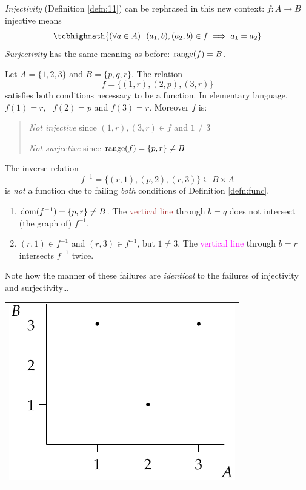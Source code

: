 \emph{Injectivity} (Definition \ref{defn:11}) can be rephrased in this new context: $f:A\to B$ injective means
\[
	\tcbhighmath{(\forall a\in A)\ \ (a_1,b),(a_2,b)\in f\implies a_1=a_2}
\]
\emph{Surjectivity} has the same meaning as before: $\operatorname{range}(f)=B$.

\goodbreak


\begin{example}[lower separated=false, sidebyside, sidebyside align=top seam, sidebyside gap=0pt, righthand width=0.33\linewidth]{}{}
	Let $A=\{1,2,3\}$ and $B=\{p,q,r\}$. The relation
	\[
		f=\bigl\{(1,r),(2,p),(3,r)\bigr\}
	\]
	satisfies both conditions necessary to be a function. In elementary language, $f(1)=r$, \ $f(2)=p$ and $f(3)=r$. Moreover $f$ is:
	\begin{quote}
		\emph{Not injective} since $(1,r),(3,r)\in f$ and $1\neq 3$\par
		\emph{Not surjective} since $\operatorname{range}(f)=\{p,r\}\neq B$
	\end{quote}
	The inverse relation
	\[
		f^{-1}=\bigl\{(r,1),(p,2),(r,3)\bigr\}
		\subseteq B\times A
	\]
	is \emph{not} a function due to failing \emph{both} conditions of Definition \ref{defn:func}.
	\begin{enumerate}
		 \item $\operatorname{dom}(f^{-1})=\{p,r\} \neq B$. The \textcolor{Brown}{vertical line} through $b=q$ does not intersect (the graph of) $f^{-1}$.
		 \item $(r,1)\in f^{-1}$ and $(r,3)\in f^{-1}$, but $1\neq 3$. The \textcolor{magenta}{vertical line} through $b=r$ intersects $f^{-1}$ twice.
	\end{enumerate}
	Note how the manner of these failures are \emph{identical} to the failures of injectivity and surjectivity\ldots
	\tcblower
	\hfill
	\begin{tabular}{@{}c@{}}
		\includegraphics{relations-18-reln1}\\

\end{tabular}
\end{example}
